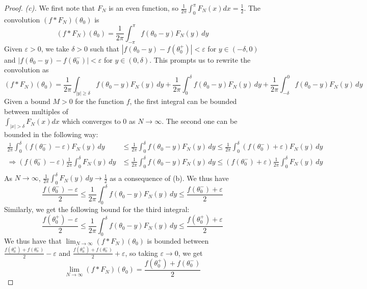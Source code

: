 \documentclass{article}
\newcommand{\longimplies}{\Longrightarrow}
\theoremstyle{definition} %
\numberwithin{thm}{section} %
\theoremstyle{definition} %
\begin{document}
\begin{proof}
\textit{(c).} We first note that $F_N$ is an even function, so 
$\frac{1}{2\pi}\int_0^\pi F_N(x)dx = \frac{1}{2}$.
The convolution $(f * F_N)(\theta_0)$ is
\[
    (f * F_N)(\theta_0) 
    = \frac{1}{2\pi} \int_{-\pi}^{\pi} f(\theta_0 - y) F_N(y) \,dy
\]
Given $\varepsilon > 0$, we take $\delta > 0$ such that 
$|f(\theta_0 - y) - f(\theta_0^+)| < \varepsilon$ for 
$y \in (-\delta, 0)$ and 
$|f(\theta_0 - y) - f(\theta_0^-)| < \varepsilon$ for
$y \in (0, \delta)$. This prompts us to rewrite the convolution as
\[
    (f * F_N)(\theta_0) 
    = \frac{1}{2\pi} \int_{|y| \geq \delta} f(\theta_0 - y) F_N(y) \,dy
    + \frac{1}{2\pi} \int_0^{\delta} f(\theta_0 - y) F_N(y) \,dy
    + \frac{1}{2\pi} \int_{-\delta}^0 f(\theta_0 - y) F_N(y) \,dy
\]
Given a bound $M > 0$ for the function $f$, the first integral can be 
bounded between multiples of\\ $\int_{|x| > \delta} F_N(x)dx$ which
converges to 0 as $N \to \infty$. The second one can be bounded
in the following way:
\begin{align*}
    \frac{1}{2\pi} \int_0^{\delta} 
    (f(\theta_0^-) - \varepsilon) F_N(y) \,dy &\leq
    \frac{1}{2\pi} \int_0^{\delta} f(\theta_0 - y) F_N(y) \,dy
    \leq \frac{1}{2\pi} \int_0^{\delta} 
    (f(\theta_0^-) + \varepsilon) F_N(y) \,dy \\
    \longimplies
    (f(\theta_0^-) - \varepsilon)\frac{1}{2\pi} 
    \int_0^{\delta} F_N(y) \,dy &\leq
    \frac{1}{2\pi} \int_0^{\delta} f(\theta_0 - y) F_N(y) \,dy
    \leq (f(\theta_0^-) + \varepsilon)\frac{1}{2\pi} 
    \int_0^{\delta} F_N(y) \,dy \\
\end{align*}
As $N \to \infty$, $\frac{1}{2\pi}\int_0^{\delta} F_N(y) \,dy 
\to \frac{1}{2}$ as a consequence of (b). We thus have
\[
    \frac{f(\theta_0^-) - \varepsilon}{2} \leq
    \frac{1}{2\pi} \int_0^{\delta} f(\theta_0 - y) F_N(y) \,dy
    \leq \frac{f(\theta_0^-) + \varepsilon}{2} 
\]
Similarly, we get the following bound for the third integral:
\[
    \frac{f(\theta_0^+) - \varepsilon}{2} \leq
    \frac{1}{2\pi} \int_0^{\delta} f(\theta_0 - y) F_N(y) \,dy
    \leq \frac{f(\theta_0^+) + \varepsilon}{2} 
\]
We thus have that $\lim_{N \to \infty}(f * F_N)(\theta_0)$ is bounded
between $\frac{f(\theta_0^+) + f(\theta_0^-)}{2} - \varepsilon$
and $\frac{f(\theta_0^+) + f(\theta_0^-)}{2} + \varepsilon$, so
taking $\varepsilon \to 0$, we get
\[
    \lim_{N \to \infty} (f * F_N)(\theta_0) = \frac{f(\theta_0^+) + f(\theta_0^-)}{2}
\]
\end{proof}
\end{document}
